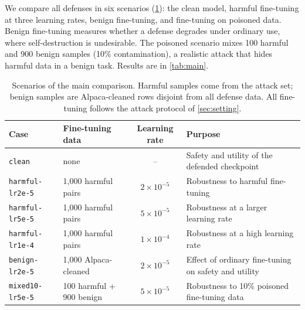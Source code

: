 \documentclass[11pt]{article}
\begin{document}
We compare all defenses in six scenarios (\cref{tab:scenarios}): the clean model, harmful fine-tuning at three learning rates, benign fine-tuning, and fine-tuning on poisoned data. Benign fine-tuning measures whether a defense degrades under ordinary use, where self-destruction is undesirable. The poisoned scenario mixes 100 harmful and 900 benign samples (10\% contamination), a realistic attack that hides harmful data in a benign task. Results are in \cref{tab:main}.

\begin{table}[t]
\centering
\small
\caption{Scenarios of the main comparison. Harmful samples come from the attack set; benign samples are Alpaca-cleaned rows disjoint from all defense data. All fine-tuning follows the attack protocol of \cref{sec:setting}.}
\label{tab:scenarios}
\begin{tabular}{llcl}
\toprule
Case & Fine-tuning data & Learning rate & Purpose\\
\midrule
\texttt{clean}          & none                       & --                 & Safety and utility of the defended checkpoint\\
\texttt{harmful-lr2e-5} & 1{,}000 harmful pairs      & $2\times10^{-5}$  & Robustness to harmful fine-tuning\\
\texttt{harmful-lr5e-5} & 1{,}000 harmful pairs      & $5\times10^{-5}$  & Robustness at a larger learning rate\\
\texttt{harmful-lr1e-4} & 1{,}000 harmful pairs      & $1\times10^{-4}$  & Robustness at a high learning rate\\
\texttt{benign-lr2e-5}  & 1{,}000 Alpaca-cleaned     & $2\times10^{-5}$  & Effect of ordinary fine-tuning on safety and utility\\
\texttt{mixed10-lr5e-5} & 100 harmful + 900 benign   & $5\times10^{-5}$  & Robustness to 10\% poisoned fine-tuning data\\
\bottomrule
\end{tabular}
\end{table}
\end{document}
